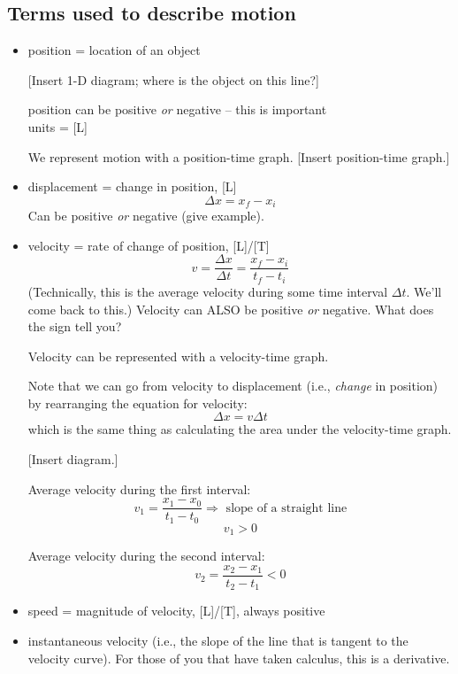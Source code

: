\subsection{Terms used to describe motion}
\begin{itemize}
\item position = location of an object

[Insert 1-D diagram; where is the object on this line?]
\vspace{4cm}

position can be positive \textit{or} negative -- this is important\\
units = [L]

We represent motion with a position-time graph.
[Insert position-time graph.]
\vspace{4cm}


\item displacement = change in position, [L] 
$$\Delta{x}=x_f-x_i$$
Can be positive \textit{or} negative (give example).

\item velocity = rate of change of position, [L]/[T]
  $$v=\frac{\Delta{x}}{\Delta{t}}=\frac{x_f-x_i}{t_f-t_i}$$
  (Technically, this is the average velocity during some time interval $\Delta t$. We'll come back to this.)
Velocity can ALSO be positive \textit{or} negative. What does the sign tell you?

Velocity can be represented with a velocity-time graph.
\vspace{4cm}



Note that we can go from velocity to displacement (i.e., \textit{change} in position) by rearranging the equation for velocity: 
$$\Delta x=v\Delta{t}$$
which is the same thing as calculating the area under the velocity-time graph.

[Insert diagram.]
\vspace{4cm}

Average velocity during the first interval:
$$v_1=\frac{x_1-x_0}{t_1-t_0}\Rightarrow\mbox{ slope of a straight line}$$
$$v_1>0$$

Average velocity during the second interval:
$$v_2=\frac{x_2-x_1}{t_2-t_1}<0$$

\item speed = magnitude of velocity, [L]/[T], always positive

\item instantaneous velocity (i.e., the slope of the line that is tangent to the velocity curve). For those of you that have taken calculus, this is a derivative.


\end{itemize}
